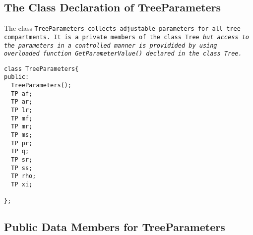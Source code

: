 \subsection{The Class Declaration of TreeParameters}

The class \tt TreeParameters \rm collects adjustable parameters for
all tree compartments. It is a private members of the class \tt Tree
\it but access to the parameters in a controlled manner is providided
by using overloaded function \tt GetParameterValue() \rm declared in
the class \tt Tree\rm.

\begin{verbatim}
class TreeParameters{
public:
  TreeParameters();
  TP af;            
  TP ar;            
  TP lr;            
  TP mf;            
  TP mr;            
  TP ms;            
  TP pr;            
  TP q;             
  TP sr;           
  TP ss;            
  TP rho;          
  TP xi;            

};
\end{verbatim}

\subsection{Public Data Members for TreeParameters}

